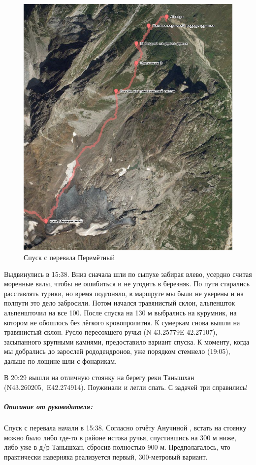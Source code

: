 \begin{figure}[h!]
	\centering
	\includegraphics[width=0.7\linewidth]{../pics/perem_down.png}
	\caption{Спуск с перевала Перемётный}
	\label{perem_down}
\end{figure} 

Выдвинулись в 15:38. Вниз сначала шли по сыпухе забирая влево, усердно считая моренные валы, чтобы не ошибиться и не угодить в березняк. По пути старались расставлять турики, но время подгоняло, в маршруте мы были не уверены и на полпути это дело забросили. Потом начался травянистый склон, альпеншток альпеншточил на все 100. После спуска на 130 м выбрались на курумник, на котором не обошлось без лёгкого кровопролития. К сумеркам снова вышли на травянистый склон. Русло пересохшего ручья (N 43.25779\degree E 42.27107\degree), засыпанного крупными камнями, предоставило вариант спуска. К моменту, когда мы добрались до зарослей рододендронов, уже порядком стемнело (19:05), дальше по лощине шли с фонарикам. 

В 20:29 вышли на отличную стоянку на берегу реки Танышхан (N43.260205\degree,~E42.274914\degree). Поужинали и легли спать. С задачей три справились! 

\subparagraph{Описание от руководителя:} 
Спуск с перевала начали в 15:38. Согласно отчёту Анучиной \cite{Anuchina2019}, встать на стоянку можно было либо где-то в районе истока ручья, спустившись на 300 м ниже, либо уже в д/р Танышхан, сбросив полностью 900 м. Предполагалось, что практически наверняка реализуется первый, 300-метровый вариант. 

